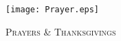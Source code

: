 \fancyhead[RE,LO]{}\fancyhead[RO,LE]{}
\fancyhead[C]{}\thispagestyle{empty}
{}
  \begin{center}
   \texttt{[image: Prayer.eps]}
   \par
   \vspace{2ex}
   	\textsc{\Huge{Prayers \& Thanksgivings}}
   \end{center}